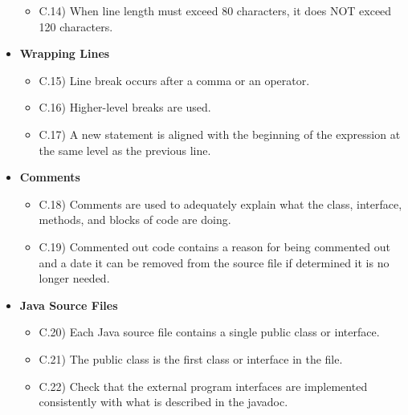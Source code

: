 \documentclass[../../codeInspection.tex]{subfiles}
\begin{document}
\begin{itemize}
\begin{itemize}
							\item C.14)\label{C:14} When line length must exceed 80 characters, it does NOT exceed 120 characters.

						\end{itemize}

				\item 	\textbf{Wrapping Lines}
						\begin{itemize}

							\item C.15)\label{C:15} Line break occurs after a comma or an operator.

							\item C.16)\label{C:16} Higher-level breaks are used.

							\item C.17)\label{C:17} A new statement is aligned with the beginning of the expression at the same level as the previous line.

						\end{itemize}

				\item 	\textbf{Comments}
						\begin{itemize}

							\item C.18)\label{C:18} Comments are used to adequately explain what the class, interface, methods, and blocks of code are doing.

							\item C.19)\label{C:19} Commented out code contains a reason for being commented out and a date it can be removed from the source file if determined it is no longer needed.

						\end{itemize}
				
				\item 	\textbf{Java Source Files}
						\begin{itemize}

							\item C.20)\label{C:20} Each Java source file contains a single public class or interface.

							\item C.21)\label{C:21} The public class is the first class or interface in the file.

							\item C.22)\label{C:22} Check that the external program interfaces are implemented consistently with what is described in the javadoc.


\end{itemize}
\end{itemize}
\end{document}
